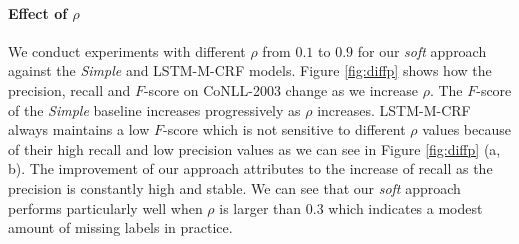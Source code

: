 \paragraph{Effect of $\rho$}
We conduct experiments with different $\rho$ from $0.1$ to $0.9$ for our {\it soft} approach against the {\it Simple} and LSTM-M-CRF models.
Figure \ref{fig:diffp} shows how the precision, recall and $F$-score on CoNLL-2003 change as we increase $\rho$. 
The $F$-score of the \textit{Simple} baseline increases progressively as $\rho$ increases. 
LSTM-M-CRF always maintains a low $F$-score which is not sensitive to different $\rho$ values because of their high recall and low precision values as we can see in Figure \ref{fig:diffp} (a, b). 
The improvement of our approach attributes to the increase of recall as the precision is constantly high and stable.
We can see that our \textit{soft} approach performs particularly well when $\rho$ is larger than 0.3 which indicates a modest amount of missing labels in practice. 

